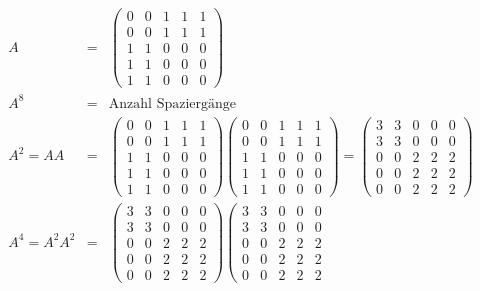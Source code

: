 \documentclass[12pt]{article}
\begin{document}
\begin{eqnarray*}
A &=& \left(
\begin{array}{lllll}
0 & 0 & 1 & 1 & 1 \\
0 & 0 & 1 & 1 & 1 \\
1 & 1 & 0 & 0 & 0 \\
1 & 1 & 0 & 0 & 0 \\
1 & 1 & 0 & 0 & 0
\end{array}
\right)   \\ 
 A^8  &=& \text{Anzahl Spaziergänge } \\
 A^2 = AA &=& 
\left( \begin{array}{lllll}
0 & 0 & 1 & 1 & 1 \\
0 & 0 & 1 & 1 & 1 \\
1 & 1 & 0 & 0 & 0 \\
1 & 1 & 0 & 0 & 0 \\
1 & 1 & 0 & 0 & 0
\end{array} \right) 
\left( \begin{array}{lllll}
0 & 0 & 1 & 1 & 1 \\
0 & 0 & 1 & 1 & 1 \\
1 & 1 & 0 & 0 & 0 \\
1 & 1 & 0 & 0 & 0 \\
1 & 1 & 0 & 0 & 0
\end{array}
\right)  =
\left( \begin{array}{lllll}
3 & 3 & 0 & 0 & 0 \\
3 & 3 & 0 & 0 & 0 \\
0 & 0 & 2 & 2 & 2 \\
0 & 0 & 2 & 2 & 2 \\
0 & 0 & 2 & 2 & 2
\end{array}
\right) \\
A^4 = A^2A^2 &=& \left( \begin{array}{lllll}
3 & 3 & 0 & 0 & 0 \\
3 & 3 & 0 & 0 & 0 \\
0 & 0 & 2 & 2 & 2 \\
0 & 0 & 2 & 2 & 2 \\
0 & 0 & 2 & 2 & 2
\end{array}
\right) \left( \begin{array}{lllll}
3 & 3 & 0 & 0 & 0 \\
3 & 3 & 0 & 0 & 0 \\
0 & 0 & 2 & 2 & 2 \\
0 & 0 & 2 & 2 & 2 \\
0 & 0 & 2 & 2 & 2
\end{array}

\end{eqnarray*}
\end{document}
